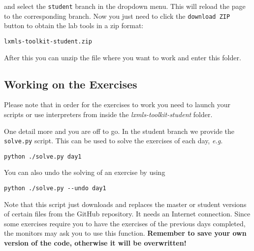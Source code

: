 \noindent and select the \verb+student+ branch in the dropdown menu. This will reload the page to the corresponding branch. Now you just need to click the \verb+download ZIP+ button to obtain the lab tools in a zip format:

\begin{verbatim}
lxmls-toolkit-student.zip
\end{verbatim}

After this you can unzip the file where you want to work and enter this folder.

\subsection{Working on the Exercises}

Please note that in order for the exercises to work you need to launch your scripts or use interpreters from inside the  \textit{lxmls-toolkit-student} folder.

One detail more and you are off to go. In the student branch we provide the \verb+solve.py+ script. This can be used to solve the exercises of each day, \emph{e.g.}

\begin{verbatim}
python ./solve.py day1
\end{verbatim}

\noindent You can also undo the solving of an exercise by using

\begin{verbatim}
python ./solve.py --undo day1
\end{verbatim}

Note that this script just downloads and replaces the master or student versions of certain files from the GitHub repository. It needs an Internet connection. Since some exercises require you to have the exercises of the previous days completed, the monitors may ask you to use this function. \textbf{Remember to save your own version of the code, otherwise it will be overwritten!}


